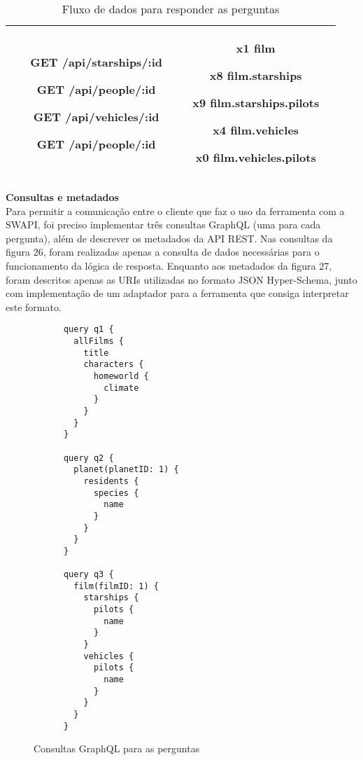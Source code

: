 \begin{table}[H]
\begin{tabular}{|c|c|c|}
\begin{minipage}[t]{0.3\textwidth}
\begin{itemize}
        \item[\textbf{GET}] /api/starships/:id
        \item[\textbf{GET}] /api/people/:id
        \item[\textbf{GET}] /api/vehicles/:id
        \item[\textbf{GET}] /api/people/:id
      \end{itemize}
    \end{minipage} & \begin{minipage}[t]{0.5\textwidth}
      \begin{itemize}
        \item[\textbf{x1}] film
        \item[\textbf{x8}] film.starships
        \item[\textbf{x9}] film.starships.pilots
        \item[\textbf{x4}] film.vehicles
        \item[\textbf{x0}] film.vehicles.pilots
      \end{itemize}
    \end{minipage} \\
    \hline
  \end{tabular}
  \caption{Fluxo de dados para responder as perguntas}
\end{table}

\textbf{Consultas e metadados} \\

Para permitir a comunicação entre o cliente que faz o uso da ferramenta com a SWAPI, foi preciso implementar três consultas GraphQL (uma para cada pergunta), além de descrever os metadados da API REST. Nas consultas da figura 26, foram realizadas apenas a consulta de dados necessárias para o funcionamento da lógica de resposta. Enquanto aos metadados da figura 27, foram descritos apenas as URIs utilizadas no formato JSON Hyper-Schema, junto com implementação de um adaptador para a ferramenta que consiga interpretar este formato.

\begin{figure}[H]
  \centering
  \begin{verbatim}
      query q1 {
        allFilms {
          title
          characters {
            homeworld {
              climate
            }
          }
        }
      }

      query q2 {
        planet(planetID: 1) {
          residents {
            species {
              name
            }
          }
        }
      }

      query q3 {
        film(filmID: 1) {
          starships {
            pilots {
              name
            }
          }
          vehicles {
            pilots {
              name
            }
          }
        }
      }
  \end{verbatim}
  \caption{Consultas GraphQL para as perguntas}
\end{figure}

